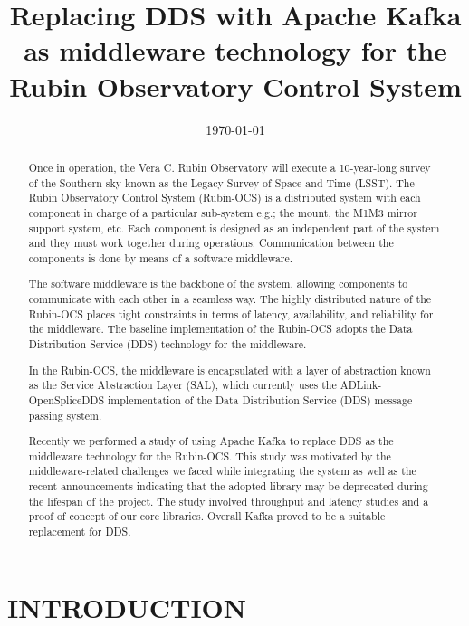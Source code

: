 \documentclass[]{spie}  %
\title{Replacing DDS with Apache Kafka as middleware technology for the Rubin Observatory Control System}
\date{\today}
\begin{document}
\maketitle

\begin{abstract}
Once in operation, the Vera C. Rubin Observatory will execute a 10-year-long survey of the Southern sky known as the Legacy Survey of Space and Time (LSST).
The Rubin Observatory Control System (Rubin-OCS) is a distributed system with each component in charge of a particular sub-system e.g.; the mount, the M1M3 mirror support system, etc.
Each component is designed as an independent part of the system and they must work together during operations.
Communication between the components is done by means of a software middleware.

The software middleware is the backbone of the system, allowing components to communicate with each other in a seamless way.
The highly distributed nature of the Rubin-OCS places tight constraints in terms of latency, availability, and reliability for the middleware.
The baseline implementation of the Rubin-OCS adopts the Data Distribution Service (DDS) technology for the middleware.

In the Rubin-OCS, the middleware is encapsulated with a layer of abstraction known as the Service Abstraction Layer (SAL), which currently uses the ADLink-OpenSpliceDDS implementation of the Data Distribution Service (DDS) message passing system.

Recently we performed a study of using Apache Kafka to replace DDS as the middleware technology for the Rubin-OCS.
This study was motivated by the middleware-related challenges we faced while integrating the system as well as the recent announcements indicating that the adopted library may be deprecated during the lifespan of the project.
The study involved throughput and latency studies and a proof of concept of our core libraries.
Overall Kafka proved to be a suitable replacement for DDS.
\end{abstract}


\section{INTRODUCTION}
\label{sec:intro}
\end{document}
